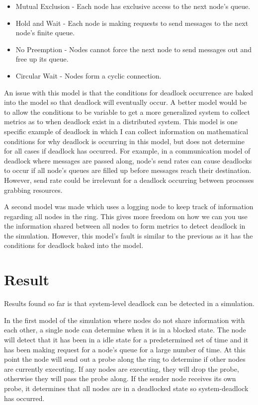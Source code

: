 \documentclass{article}
\begin{document}
\begin{itemize}
	\item Mutual Exclusion - Each node has exclusive access to the next node's queue.
	\item Hold and Wait - Each node is making requests to send messages to the next node's finite queue.
	\item No Preemption - Nodes cannot force the next node to send messages out and free up its queue.
	\item Circular Wait - Nodes form a cyclic connection.\newline
\end{itemize}

An issue with this model is that the conditions for deadlock occurrence are baked into the model so that deadlock will eventually occur. A better model would be to allow the conditions to be variable to get a more generalized system to collect metrics as to when deadlock exist in a distributed system. This model is one specific example of deadlock in which I can collect information on mathematical conditions for why deadlock is occurring in this model, but does not determine for all cases if deadlock has occurred. For example, in a communication model of deadlock where messages are passed along, node's send rates can cause deadlocks to occur if all node's queues are filled up before messages reach their destination. However, send rate could be irrelevant for a deadlock occurring between processes grabbing resources. 

A second model was made which uses a logging node to keep track of information regarding all nodes in the ring. This gives more freedom on how we can you use the information shared between all nodes to form metrics to detect deadlock in the simulation. However, this model's fault is similar to the previous as it has the conditions for deadlock baked into the model.

\section{Result} %

Results found so far is that system-level deadlock can be detected in a simulation. 

In the first model of the simulation where nodes do not share information with each other, a single node can determine when it is in a blocked state. The node will detect that it has been in a idle state for a predetermined set of time and it has been making request for a node's queue for a large number of time. At this point the node will send out a probe along the ring to determine if other nodes are currently executing. If any nodes are executing, they will drop the probe, otherwise they will pass the probe along. If the sender node receives its own probe, it determines that all nodes are in a deadlocked state so system-deadlock has occurred.
\end{document}
